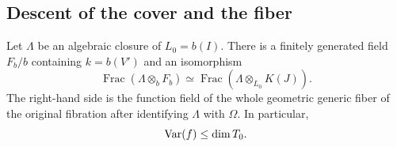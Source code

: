\subsection{Descent of the cover and the fiber}

\begin{proposition}
\label{ds:whole}
Let $\Lambda$ be an algebraic closure of $L_0=b(I)$.  There is a
finitely generated field $F_b/b$ containing $k=b(V')$ and an isomorphism
\begin{equation}
 \operatorname{Frac}(\Lambda\otimes_b F_b)
   \simeq
 \operatorname{Frac}(\Lambda\otimes_{L_0}K(J)).
 \label{ds:whole-field}
\end{equation}
The right-hand side is the function field of the whole geometric
generic fiber of the original fibration after identifying
$\Lambda$ with $\Omega$.  In particular,
\begin{equation}
 \operatorname{Var}(f)\leq\dim T_0.
 \label{ds:variation}
\end{equation}
\end{proposition}

